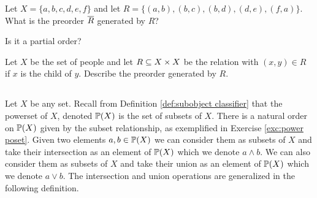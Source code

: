 \begin{exampleRUS}\label{ex:preorder generated}
\end{exampleRUS}

\begin{exerciseENG}
Let $X=\{a,b,c,d,e,f\}$ and let $R=\{(a,b),(b,c),(b,d),(d,e),(f,a)\}$. 
\sexc What is the preorder $\ol{R}$ generated by $R$?
\item Is it a partial order?
\endsexc
\end{exerciseENG}

\begin{exerciseRUS}
\end{exerciseRUS}

\begin{exerciseENG}
Let $X$ be the set of people and let $R\ss X\times X$ be the relation with $(x,y)\in R$ if $x$ is the child of $y$. Describe the preorder generated by $R$.
\end{exerciseENG}

\begin{exerciseRUS}
\end{exerciseRUS}


\subsection{}\label{sec:meets and joins}

\begin{blockENG}
Let $X$ be any set. Recall from Definition \ref{def:subobject classifier} that the powerset of $X$, denoted $\PP(X)$ is the set of subsets of $X$. There is a natural order on $\PP(X)$ given by the subset relationship, as exemplified in Exercise \ref{exc:power poset}. Given two elements $a,b\in\PP(X)$ we can consider them as subsets of $X$ and take their intersection as an element of $\PP(X)$ which we denote $a\wedge b$. We can also consider them as subsets of $X$ and take their union as an element of $\PP(X)$ which we denote $a\vee b$. The intersection and union operations are generalized in the following definition.
\end{blockENG}

\begin{blockRUS}
\end{blockRUS}

